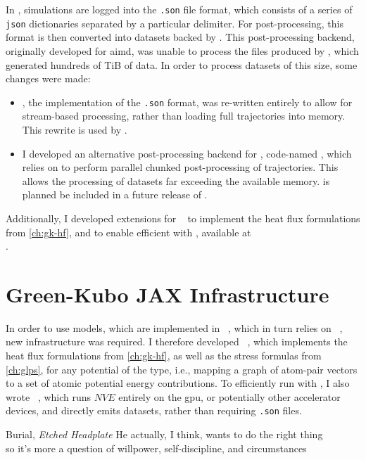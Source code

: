 In \vibes, \md simulations are logged into the \texttt{.son} file format, which consists of a series of \texttt{json} dictionaries separated by a particular delimiter. For post-processing, this format is then converted into  datasets backed by . This post-processing backend, originally developed for \gls{aimd}, was unable to process the files produced by \mlp \md, which generated hundreds of \unit{TiB} of data.
In order to process datasets of this size, some changes were made:
\begin{itemize}
	\item {}, the implementation of the \texttt{.son} format, was re-written entirely to allow for stream-based processing, rather than loading full trajectories into memory. This rewrite is used by \vibes.
	\item I developed an alternative post-processing backend for \vibes, code-named , which relies on  to perform parallel chunked post-processing of  trajectories. This allows the processing of datasets far exceeding the available memory.  is planned be included in a future release of \vibes.
\end{itemize}
Additionally, I developed extensions for \schnetpack~\cite{sktm2019q} to implement the heat flux formulations from \cref{ch:gk-hf}, and to enable efficient \md with \vibes, available at\\
.

\section{Green-Kubo JAX Infrastructure}
\label{sec:si-glp}

In order to use \sok models, which are implemented in \mlff~\cite{mlff}, which in turn relies on \jax~\cite{jax}, new infrastructure was required. I therefore developed \glpc~\cite{glp}, which implements the heat flux formulations from \cref{ch:gk-hf}, as well as the stress formulas from \cref{ch:glps}, for any potential of the \glp type, i.e., mapping a graph of atom-pair vectors to a set of atomic potential energy contributions. To efficiently run \md with \glp, I also wrote \gkx~\cite{gkx}, which runs $NVE$ \md entirely on the \gls{gpu}, or potentially other accelerator devices, and directly emits  datasets, rather than requiring \texttt{.son} files.

\vspace*{\fill}

\begin{chapquote}{Burial, \textit{Etched Headplate}}
\noindent
He actually, I think, wants to do the right thing\el\\ so it's more a question of willpower, self-discipline, and circumstances\el
\end{chapquote}

\vspace*{\fill}

